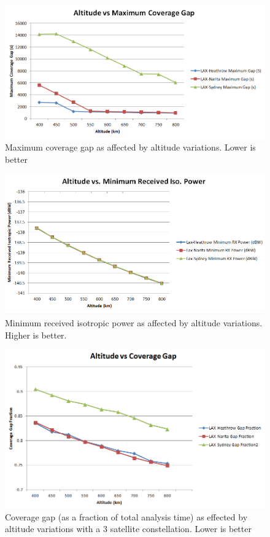 \begin{figure}[htbp]
	\centering
	\includegraphics[scale = 0.6]{Pictures/AltitudeVsMaxGap12sat.png}
	
	\caption{Maximum coverage gap as affected by altitude variations. Lower is better}
	\label{fig:AltitudeVsMaxGap12sat}
\end{figure} 

\begin{figure}[htbp]
	\centering
	\includegraphics[scale = 0.6]{Pictures/AltitudeVsRxPower12sat.png}
	
	\caption{Minimum received isotropic power as affected by altitude variations. Higher is better.}
	\label{fig:AltitudeVsRxPower12sat}
\end{figure}


\begin{figure}[htbp]
	\centering
	\includegraphics[scale = 0.6]{Pictures/AltitudeVsCovGap3sat.png}
	
	\caption{Coverage gap (as a fraction of total analysis time) as effected by altitude variations with a 3 satellite constellation. Lower is better}
	\label{fig:AltitudeVsCovGap3sat}
\end{figure} 


